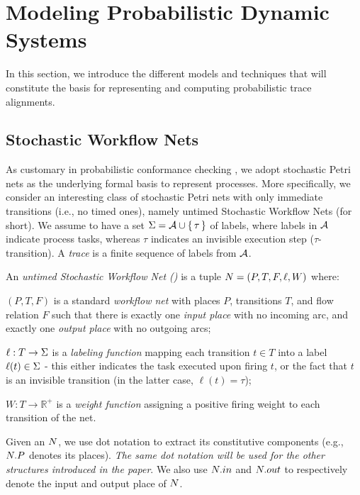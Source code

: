 
\section{Modeling Probabilistic Dynamic Systems}
\label{sec:models}
In this section, we introduce the different models and techniques that will constitute the basis for representing and computing probabilistic trace alignments.

\subsection{Stochastic Workflow Nets}\label{subsec:spn}
As customary in probabilistic conformance checking \cite{DBLP:conf/bpm/LeemansSA19,DBLP:conf/icpm/PolyvyanyyK19,DBLP:journals/tosem/PolyvyanyySWCM20}, we adopt stochastic Petri nets \cite{MarsanCB84,Desel1998,RoggeSoltiAW13} as the underlying formal basis to represent processes. More specifically, we consider an interesting class of stochastic Petri nets with only immediate transitions (i.e., no timed ones), namely untimed Stochastic Workflow Nets (\uswn for short).
We assume to have a set $\Sigma = \mathcal{A} \cup \set{\tau}$ of labels, where labels in $\mathcal{A}$ indicate process tasks, whereas $\tau$ indicates an invisible execution step ($\tau$-transition). A \emph{trace} is a finite sequence of labels from $\mathcal{A}$.

\begin{definition} An \emph{untimed Stochastic Workflow Net (\uswn)}
is a tuple $N = (P,T,F,\ell,W)$ where:
\begin{compactitem}
\item $(P,T,F)$ is a standard \emph{workflow net} with places $P$, transitions $T$, and flow relation $F$ such that there is exactly one \emph{input place} with no incoming arc, and exactly one \emph{output place} with no outgoing arcs;
\item $\ell: T \rightarrow \Sigma$ is a \emph{labeling function} mapping each transition $t \in T$ into a label $\ell(t) \in \Sigma$ - this either indicates the task executed upon firing $t$, or the fact that $t$ is an invisible transition (in the latter case, $\ell(t) = \tau$);
\item $W\colon T\to \mathbb{R}^+$ is a \emph{weight function} assigning a positive firing weight to each transition of the net.
\end{compactitem}
\end{definition}
Given an \uswn $N$, we use dot notation to extract its constitutive components (e.g., $N.P$ denotes its places). \emph{The same dot notation will be used for the other structures introduced in the paper}. We also use $N.in$ and $N.out$ to respectively denote the input and output place of $N$.

